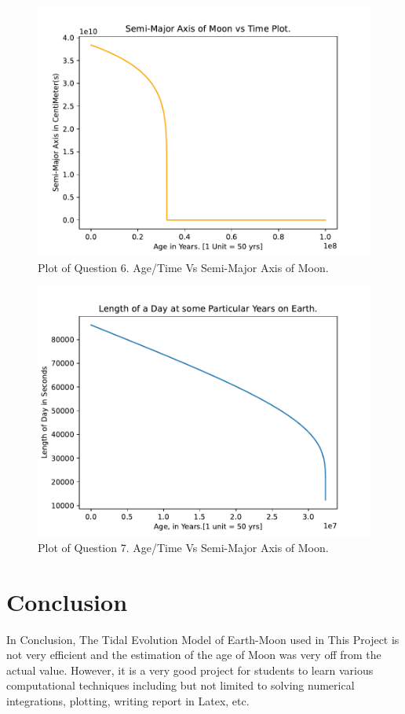 \documentclass[12pt, letterpaper]{article}
\begin{document}
\begin{figure}[!htb]
    \centering
    \includegraphics[scale=0.9]{Q6.pdf}
    \caption{Plot of Question 6. Age/Time Vs Semi-Major Axis of Moon.}
    \label{fig:Q6.pdf}
\end{figure}
\begin{figure}[!htb]
    \centering
    \includegraphics[scale=0.9]{Q72.pdf}
    \caption{Plot of Question 7. Age/Time Vs Semi-Major Axis of Moon.}
    \label{fig:Q72.pdf}
\end{figure}

\newpage
\section*{Conclusion}

In Conclusion, The Tidal Evolution Model of Earth-Moon used in This Project is not very efficient and the estimation of the age of Moon was very off from the actual value. However, it is a very good project for students to learn various computational techniques including but not limited to solving numerical integrations, plotting, writing report in Latex, etc. 
\end{document}
